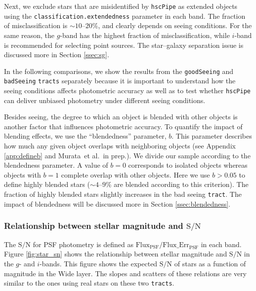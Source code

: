 \documentclass[useamsfonts]{pasj01}
\def\etal{{\ et al.~}}
\def\hscpipe{\texttt{hscPipe}}
\def\tract{\texttt{tract}}
\def\tracts{\texttt{tracts}}
\def\s2n{{$\mathrm{S}/\mathrm{N}$}}
\begin{document}
    Next, we exclude stars that are misidentified by \hscpipe{} as extended
    objects using the \texttt{classification.extendedness} parameter in each band.
    The fraction of misclassification is ${\sim}10$--$20$\%, and clearly depends on
    seeing conditions.
    For the same reason, the $g$-band has the highest fraction of misclassification,
    while $i$-band is recommended for selecting point sources.
    The star--galaxy separation issue is discussed more in Section \ref{ssec:sg}.

    In the following comparisons, we show the results from the
    \texttt{goodSeeing} and \texttt{badSeeing} \tracts{} separately because it
    is important to understand how the seeing conditions affects photometric accuracy 
    as well as to test whether \hscpipe{} can deliver unbiased photometry under 
    different seeing conditions.
    
    Besides seeing, the degree to which an object is blended with other objects 
    is another factor that influences photometric accuracy. 
    To quantify the impact of blending effects, we use the ``blendedness'' 
    parameter, $b$. 
    This parameter describes how much any given object overlaps with neighboring 
    objects (see Appendix \ref{app:defineb} and Murata\etal in prep.). 
    We divide our sample according to the blendedness parameter. 
    A value of $b=0$ corresponds to isolated objects whereas objects with $b=1$ 
    complete overlap with other objects. 
    Here we use $b>0.05$ to define highly blended stars (${\sim}4$--$9$\% are blended
    according to this criterion).
    The fraction of highly blended stars slightly increases in the bad seeing \tract{}. 
    The impact of blendedness will be discussed more in Section \ref{ssec:blendedness}.

\subsubsection{Relationship between stellar magnitude and \s2n{}}

    The \s2n{} for PSF photometry is defined as
    $\mathrm{Flux}_{\mathrm{PSF}}/\mathrm{Flux\_Err}_{\mathrm{PSF}}$ in each band. 
    Figure \ref{fig:star_sn} shows the relationship between stellar magnitude and \s2n{} 
    in the $g$- and $i$-bands. 
    This figure shows the expected \s2n{} of stars as a function of magnitude in the 
    Wide layer.
    The slopes and scatters of these relations are very similar to the ones using 
    real stars on these two \tracts{}.
    
\end{document}
